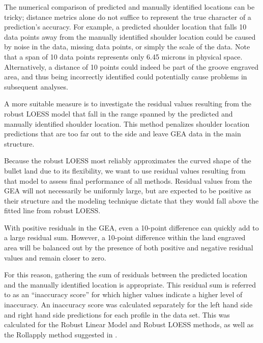 \documentclass[]{article}
\begin{document}
{\color{orange}{the next couple of paragraphs up to XXX need more work. You are going chronologically through the explanation - that puts too much emphasis on things we decided not to do. Come in from the back, i.e. define the measure used first, then go into some explanation.  }}

The numerical comparison of predicted and manually identified locations
can be tricky; distance metrics alone do not suffice to represent the
true character of a prediction's accuracy. For example, a predicted
shoulder location that falls 10 data points away from the manually
identified shoulder location could be caused by noise in the data,
missing data points, or simply the scale of the data. Note that a span
of 10 data points represents only 6.45 microns in physical space.
Alternatively, a distance of 10 points could indeed be part of the
groove engraved area, and thus being incorrectly identified could
potentially cause problems in subsequent analyses.

A more suitable measure is to investigate the residual values resulting
from the robust LOESS model that fall in the range spanned by the
predicted and manually identified shoulder location. This method
penalizes shoulder location predictions that are too far out to the side
and leave GEA data in the main structure.

Because the robust LOESS most reliably approximates the curved shape of
the bullet land due to its flexibility, we want to use residual values
resulting from that model to assess final performance of all methods.
Residual values from the GEA will not necessarily be uniformly large,
but are expected to be positive as their structure and the modeling
technique dictate that they would fall above the fitted line from robust
LOESS.

With positive residuals in the GEA, even a 10-point difference can
quickly add to a large residual sum. However, a 10-point difference
within the land engraved area will be balanced out by the presence of
both positive and negative residual values and remain closer to zero.

For this reason, gathering the sum of residuals between the predicted
location and the manually identified location is appropriate. This
residual sum is referred to as an ``inaccuracy score'' for which higher
values indicate a higher level of inaccuracy. An inaccuracy score was
calculated separately for the left hand side and right hand side
predictions for each profile in the data set. This was calculated for
the Robust Linear Model and Robust LOESS methods, as well as the
Rollapply method suggested in \citet{Hare1}.
\end{document}
